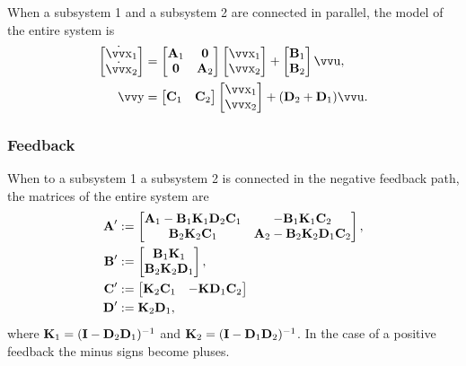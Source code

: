 When a subsystem 1 and a subsystem 2 are connected in parallel, the model of the entire system is
\begin{align*}
	\begin{bmatrix}
		\dot{\vec{x}}_1 \\ \dot{\vec{x}}_2
	\end{bmatrix}
	&=
	\begin{bmatrix}
			\mx{A}_1 & \mx{0} \\
			\mx{0} & \mx{A}_2 
	\end{bmatrix}
	\begin{bmatrix}
		\vec{x}_1 \\ \vec{x}_2
	\end{bmatrix}
	+
	\begin{bmatrix}
		\mx{B}_1 \\ \mx{B}_2
	\end{bmatrix}
	\vec{u},
	\\
	\vec{y}
	&=
	\begin{bmatrix}
		\mx{C}_1 & \mx{C}_2
	\end{bmatrix}
	\begin{bmatrix}
		\vec{x}_1 \\ \vec{x}_2
	\end{bmatrix}
	+
	(\mx{D}_2 + \mx{D}_1) \vec{u}.
\end{align*}

\subsubsection{Feedback}

When to a subsystem 1 a subsystem 2 is connected in the negative feedback path, the matrices of the entire system are
\begin{align*}
	\bm{\mathrm{A}}' &:=
	\begin{bmatrix}
		\bm{\mathrm{A}}_1 - \bm{\mathrm{B}}_1 \bm{\mathrm{K}}_1 \bm{\mathrm{D}}_2 \bm{\mathrm{C}}_1 &
		-\bm{\mathrm{B}}_1 \bm{\mathrm{K}}_1 \bm{\mathrm{C}}_2 \\
		\bm{\mathrm{B}}_2 \bm{\mathrm{K}}_2 \bm{\mathrm{C}}_1 &
		\bm{\mathrm{A}}_2 - \bm{\mathrm{B}}_2 \bm{\mathrm{K}}_2 \bm{\mathrm{D}}_1 \bm{\mathrm{C}}_2
	\end{bmatrix},
	\\
	\bm{\mathrm{B}}' &:= 
	\begin{bmatrix}
		\bm{\mathrm{B}}_1 \bm{\mathrm{K}}_1 \\ \bm{\mathrm{B}}_2 \bm{\mathrm{K}}_2 \bm{\mathrm{D}}_1
	\end{bmatrix},
	\\
	\bm{\mathrm{C}}' &:= 
	\begin{bmatrix}
		\bm{\mathrm{K}}_2 \bm{\mathrm{C}}_1 &
		-\bm{\mathrm{K}} \bm{\mathrm{D}}_1 \bm{\mathrm{C}}_2
	\end{bmatrix}
	\\
	\bm{\mathrm{D}}' &:= \bm{\mathrm{K}}_2 \bm{\mathrm{D}}_1,
\end{align*}
where \(\bm{\mathrm{K}}_1 = (\bm{\mathrm{I}} - \bm{\mathrm{D}}_2 \bm{\mathrm{D}}_1)^{-1}\) and  \(\bm{\mathrm{K}}_2 = (\bm{\mathrm{I}} - \bm{\mathrm{D}}_1 \bm{\mathrm{D}}_2)^{-1}\). In the case of a positive feedback the minus signs become pluses.

